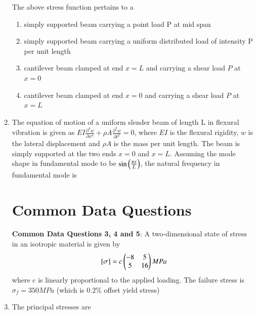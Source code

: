 \documentclass[journal,12pt,onecolumn]{IEEEtran}
\theoremstyle{remark}
\begin{document}
\begin{enumerate}
      The above stress function pertains to a 
      \begin{enumerate}
      \item simply supported beam carrying a point load P at mid span 
      \item simply supported beam carrying a uniform distributed load of intensity P per unit length 
      \item cantilever beam clamped at end $x = L$ and carrying a shear load $P$ at $x = 0$
      \item cantilever beam clamped at end $x = 0$ and carrying a shear load $P$ at $x = L$
      \end{enumerate}
\item The equation of motion of a uniform slender beam of length L in flexural vibration is given as $EI
\frac{{\partial}^4 w}{\partial {x}^{4}} + \rho A \frac{{\partial}^{2} w}{\partial {t}^{2}}=0$, where $EI$ is the flexural rigidity, $w$ is the lateral displacement and $\rho A$ is the mass per unit length. The beam is simply supported at the two ends $x =0$ and $x=L$. Assuming the mode shape in fundamental mode to be $\sin\left(\frac{{\pi x}}{L}\right)$, the natural frequency in fundamental mode is 
\begin{enumerate}
\end{enumerate}

\section{Common Data Questions}
\textbf{Common Data Questions 3, 4 and 5}: A two-dimensional state of stress in an isotropic material is given by 
\begin{align}
   {}\left[\sigma\right] = c \begin{pmatrix}-8 & 5 \\ 5 & 16\end{pmatrix} MPa
\end{align} 
where c is linearly proportional to the applied loading. The failure stress is $\sigma_{f}=350MPa$ (which is $0.2\%$ offset yield stress)
\item The principal stresses are 
\begin{enumerate}
\end{enumerate}


\end{enumerate}
\end{document}
